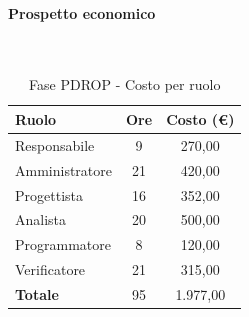 \documentclass[../PianoProgetto.tex]{subfiles}
\begin{document}
	\paragraph{Prospetto economico}\
					
	\begin{table}[H]
		\centering
	
		\begin{tabular}{l * {2}{c}}
			\toprule
			\textbf{Ruolo} & \textbf{Ore} & \textbf{Costo (\euro{})} \\
			\midrule
			Responsabile & 9     &  270,00 \\
			Amministratore  & 21    &  420,00 \\
			Progettista  & 16   &  352,00 \\
			Analista & 20    &  500,00 \\
			Programmatore  & 8    &  120,00 \\
			Verificatore  & 21    &  315,00 \\
			\midrule
			\textbf{Totale}  & 95   &  1.977,00 \\
			\bottomrule
		\end{tabular}
		\caption{Fase PDROP - Costo per ruolo}
		\label{tab:fasePDROP_costo}
	\end{table}
\vfill	
\newpage
\vfill	
	
\end{document}
